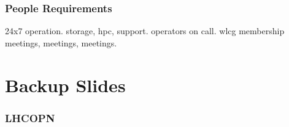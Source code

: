 \documentclass{beamer}
\begin{document}
\begin{frame}
\frametitle{People Requirements} 
24x7 operation.
storage, hpc, support.
operators on call.
wlcg membership
meetings, meetings, meetings.
\end{frame}
\section{Backup Slides}
\begin{frame}
  \frametitle{LHCOPN}
\end{frame}
\end{document}
